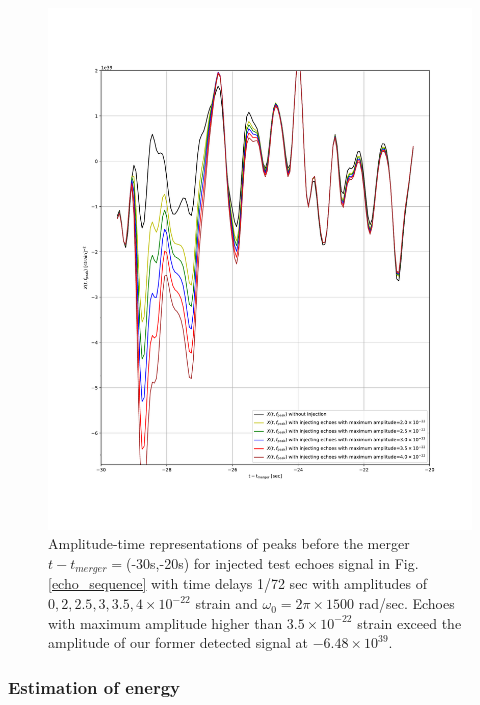 \documentclass[12pt]{article}
\begin{document}
\begin{enumerate}
\begin{figure}[t]
    \includegraphics[width=1\textwidth]{peaks_in_time_72Hz_alpha_0015_f_cut-1500.pdf}
 \caption{Amplitude-time representations of peaks before the merger $t-t_{merger}=$(-30s,-20s) for injected test echoes signal in Fig. \ref{echo_sequence} with time delays 1/72 sec with amplitudes of $0, 2, 2.5, 3, 3.5, 4 \times 10^{-22}$ strain and $\omega_{0}=2\pi \times 1500$ rad/sec. Echoes with maximum amplitude higher than $3.5\times 10^{-22}$ strain exceed the amplitude of our former detected signal at $-6.48\times10^{39}$.}
 \label{peak_72Hz_1500}
\end{figure}




\end{enumerate}


\subsubsection{Estimation of energy}
\end{document}
